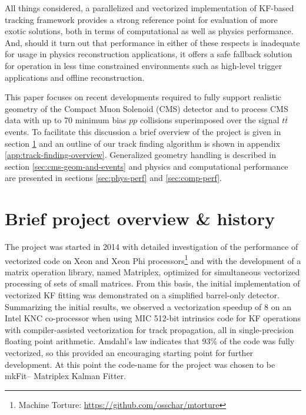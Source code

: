 \documentclass{webofc}
\def\mkfit{mkFit\xspace}
\begin{document}
All things considered, a parallelized and vectorized implementation of KF-based
tracking framework provides a strong reference point for evaluation of more
exotic solutions, both in terms of computational as well as physics
performance. And, should it turn out that performance in either of these
respects is inadequate for usage in physics reconstruction applications, it
offers a safe fallback solution for operation in less time constrained
environments such as high-level trigger applications and offline reconstruction.

This paper focuses on recent developments required to fully support realistic
geometry of the Compact Muon Solenoid (CMS) detector and to process CMS data
with up to 70 minimum bias $pp$ collisions superimposed over the signal $t\bar{t}$
events. To facilitate this discussion a brief overview of the project is given
in section \ref{sec:project-overview} and an outline of our track finding
algorithm is shown in appendix \ref{app:track-finding-overview}. Generalized
geometry handling is described in section \ref{sec:cms-geom-and-events} and
physics and computational performance are presented in sections
\ref{sec:phys-perf} and \ref{sec:comp-perf}.


\section{Brief project overview \& history}
\label{sec:project-overview}

The project was started in 2014 with detailed investigation of the performance
of vectorized code on Xeon and Xeon Phi processors\footnote{Machine Torture:
  \url{https://github.com/osschar/mtorture}} and with the development of a
matrix operation library, named Matriplex, optimized for simultaneous vectorized
processing of sets of small matrices. From this basis, the initial
implementation of vectorized KF fitting was demonstrated on a simplified
barrel-only detector\cite{pkf-fit}. Summarizing the initial results, we observed
a vectorization speedup of 8 on an Intel KNC co-processor when using MIC 512-bit
intrinsics code for KF operations with compiler-assisted vectorization for track
propagation, all in single-precision floating point arithmetic.  Amdahl's law
indicates that 93\% of the code was fully vectorized, so this provided an
encouraging starting point for further development. At this point the code-name
for the project was chosen to be \mkfit -- Matriplex Kalman Fitter.
\end{document}
